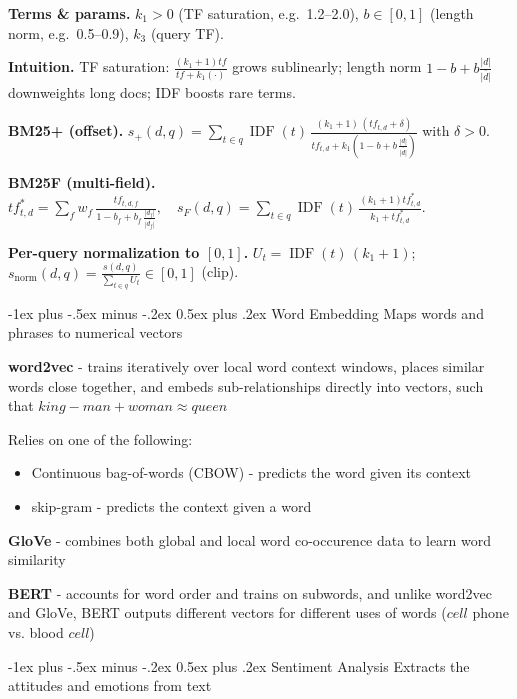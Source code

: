 \documentclass[10pt,landscape]{article}
\makeatletter
\renewcommand{\subsection}{\@startsection{subsection}{2}{0mm}%
                                {-1ex plus -.5ex minus -.2ex}%
                                {0.5ex plus .2ex}%
                                {\normalfont\normalsize\bfseries}}
\makeatother
\begin{document}
\begin{multicols}{3}
    \textbf{Terms \& params.}
    $k_1{>}0$ (TF saturation, e.g.\ 1.2–2.0), $b\in[0,1]$ (length norm, e.g.\ 0.5–0.9), $k_3$ (query TF).

    \textbf{Intuition.}
    TF saturation: $\frac{(k_1+1)tf}{tf+k_1(\cdot)}$ grows sublinearly; length norm $1-b+b\frac{|d|}{\overline{|d|}}$ downweights long docs; IDF boosts rare terms.

    \textbf{BM25+ (offset).}
    $\displaystyle s_+(d,q)=\sum_{t\in q}\operatorname{IDF}(t)\,
        \frac{(k_1+1)\,(tf_{t,d}+\delta)}{tf_{t,d}+k_1\!\left(1-b+b\,\tfrac{|d|}{\overline{|d|}}\right)}$ with $\delta{>}0$.

    \textbf{BM25F (multi-field).}
    $\displaystyle tf^{\!*}_{t,d}=\sum_f w_f\,\frac{tf_{t,d,f}}{1-b_f+b_f\,\tfrac{|d_f|}{\overline{|d_f|}}},\quad
        s_F(d,q)=\sum_{t\in q}\operatorname{IDF}(t)\,\frac{(k_1+1)tf^{\!*}_{t,d}}{k_1+tf^{\!*}_{t,d}}$.

    \textbf{Per-query normalization to $[0,1]$.}
    $U_t=\operatorname{IDF}(t)\,(k_1+1)$; \;
    $\displaystyle s_{\mathrm{norm}}(d,q)=\frac{s(d,q)}{\sum_{t\in q} U_t}\in[0,1]$ (clip).

    \subsection{Word Embedding}
    Maps words and phrases to numerical vectors

    \textbf{word2vec} - trains iteratively over local  word context windows, places similar words close together, and embeds sub-relationships directly into vectors, such that $king - man + woman \approx queen$

    Relies on one of the following:
    \begin{itemize}[label={--},leftmargin=4mm]
        \itemsep -.4mm
        \item Continuous bag-of-words (CBOW) - predicts the word given its context
        \item skip-gram - predicts the context given a word
    \end{itemize}

    \textbf{GloVe} - combines both global and local word co-occurence data to learn word similarity

    \textbf{BERT} - accounts for word order and trains on subwords, and unlike word2vec and GloVe, BERT outputs different vectors for different uses of words ($cell$ phone vs. blood $cell$)

    \subsection{Sentiment Analysis}
    Extracts the attitudes and emotions from text


\end{multicols}
\end{document}
